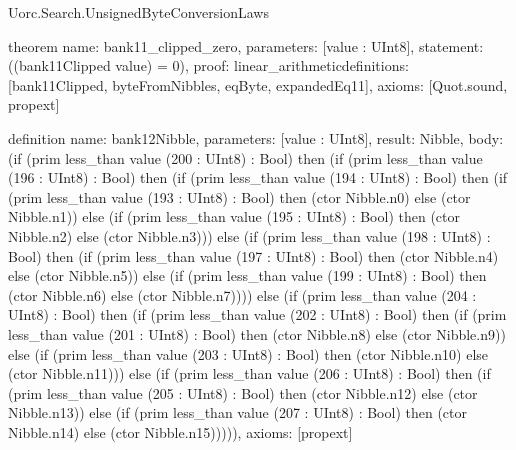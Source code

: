 \begin{lexlean}{Uorc.Search.UnsignedByteConversionLaws}
\begin{semanticmodule}
theorem{
  name: bank11_clipped_zero,
  parameters: [value : UInt8],
  statement: ((bank11Clipped value) = 0),
  proof: linear_arithmetic{definitions: [bank11Clipped, byteFromNibbles, eqByte, expandedEq11]},
  axioms: [Quot.sound, propext]
}

definition{
  name: bank12Nibble,
  parameters: [value : UInt8],
  result: Nibble,
  body: (if (prim less_than value (200 : UInt8) : Bool) then (if (prim less_than value (196 : UInt8) : Bool) then (if (prim less_than value (194 : UInt8) : Bool) then (if (prim less_than value (193 : UInt8) : Bool) then (ctor Nibble.n0) else (ctor Nibble.n1)) else (if (prim less_than value (195 : UInt8) : Bool) then (ctor Nibble.n2) else (ctor Nibble.n3))) else (if (prim less_than value (198 : UInt8) : Bool) then (if (prim less_than value (197 : UInt8) : Bool) then (ctor Nibble.n4) else (ctor Nibble.n5)) else (if (prim less_than value (199 : UInt8) : Bool) then (ctor Nibble.n6) else (ctor Nibble.n7)))) else (if (prim less_than value (204 : UInt8) : Bool) then (if (prim less_than value (202 : UInt8) : Bool) then (if (prim less_than value (201 : UInt8) : Bool) then (ctor Nibble.n8) else (ctor Nibble.n9)) else (if (prim less_than value (203 : UInt8) : Bool) then (ctor Nibble.n10) else (ctor Nibble.n11))) else (if (prim less_than value (206 : UInt8) : Bool) then (if (prim less_than value (205 : UInt8) : Bool) then (ctor Nibble.n12) else (ctor Nibble.n13)) else (if (prim less_than value (207 : UInt8) : Bool) then (ctor Nibble.n14) else (ctor Nibble.n15))))),
  axioms: [propext]
}


\end{semanticmodule}
\end{lexlean}
